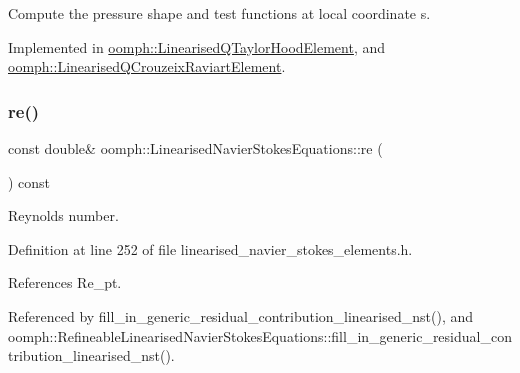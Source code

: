 Compute the pressure shape and test functions at local coordinate s. 



Implemented in \hyperlink{classoomph_1_1LinearisedQTaylorHoodElement_a468b7ce0892709fada4b19acf74646e7}{oomph\+::\+Linearised\+Q\+Taylor\+Hood\+Element}, and \hyperlink{classoomph_1_1LinearisedQCrouzeixRaviartElement_ac159b94150d8c3ac032cc6be6ed579b1}{oomph\+::\+Linearised\+Q\+Crouzeix\+Raviart\+Element}.

\mbox{\label{classoomph_1_1LinearisedNavierStokesEquations_a310f3fe61c7b2a0c7fcdf0b1efce97bc}} 
\subsubsection{\texorpdfstring{re()}{re()}}
{\footnotesize\ttfamily const double\& oomph\+::\+Linearised\+Navier\+Stokes\+Equations\+::re (\begin{DoxyParamCaption}{ }\end{DoxyParamCaption}) const\hspace{0.3cm}{\ttfamily [inline]}}



Reynolds number. 



Definition at line 252 of file linearised\+\_\+navier\+\_\+stokes\+\_\+elements.\+h.



References Re\+\_\+pt.



Referenced by fill\+\_\+in\+\_\+generic\+\_\+residual\+\_\+contribution\+\_\+linearised\+\_\+nst(), and oomph\+::\+Refineable\+Linearised\+Navier\+Stokes\+Equations\+::fill\+\_\+in\+\_\+generic\+\_\+residual\+\_\+contribution\+\_\+linearised\+\_\+nst().

\mbox{\label{classoomph_1_1LinearisedNavierStokesEquations_aee01216b1e67c105371b812fb044e61a}} 
